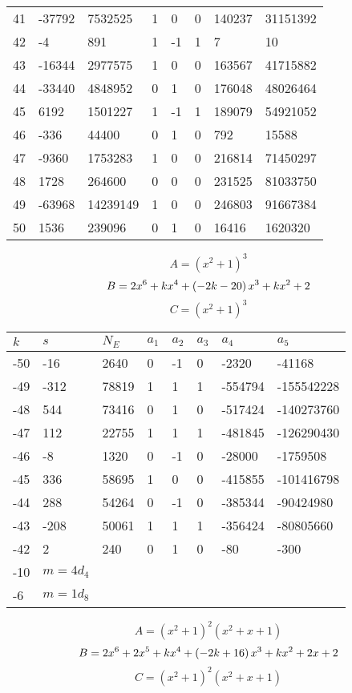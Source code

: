\documentclass{amsart}
\begin{document}
\begin{longtable}{|l|l|l|lllll|}
41&-37792&7532525&1&0&0&140237&31151392\\
42&-4&891&1&-1&1&7&10\\
43&-16344&2977575&1&0&0&163567&41715882\\
44&-33440&4848952&0&1&0&176048&48026464\\
45&6192&1501227&1&-1&1&189079&54921052\\
46&-336&44400&0&1&0&792&15588\\
47&-9360&1753283&1&0&0&216814&71450297\\
48&1728&264600&0&0&0&231525&81033750\\
49&-63968&14239149&1&0&0&246803&91667384\\
50&1536&239096&0&1&0&16416&1620320\\
\hline
\end{longtable}
$$A=(x^2
 + 1)^{3}$$
$$B=2\*x^6
 + k\*x^4
 + \left(-2\*k
 - 20\right) \*x^3
 + k\*x^2
 + 2$$
$$C=(x^2
 + 1)^{3}$$
\begin{longtable}{|l|l|l|lllll|}
\hline
$k$ & $s$ & $N_E$ & $a_1$ & $a_2$ & $a_3$ & $a_4$ & $a_5$\\
\hline
-50&-16&2640&0&-1&0&-2320&-41168\\
-49&-312&78819&1&1&1&-554794&-155542228\\
-48&544&73416&0&1&0&-517424&-140273760\\
-47&112&22755&1&1&1&-481845&-126290430\\
-46&-8&1320&0&-1&0&-28000&-1759508\\
-45&336&58695&1&0&0&-415855&-101416798\\
-44&288&54264&0&-1&0&-385344&-90424980\\
-43&-208&50061&1&1&1&-356424&-80805660\\
-42&2&240&0&1&0&-80&-300\\
-10&$m=4d_{4}$&&\multicolumn{5}{c|}{}\\
-6&$m=1d_{8}$&&\multicolumn{5}{c|}{}\\
\hline
\end{longtable}
$$A=(x^2
 + 1)^{2}(x^2
 + x
 + 1)$$
$$B=2\*x^6
 + 2\*x^5
 + k\*x^4
 + \left(-2\*k
 + 16\right) \*x^3
 + k\*x^2
 + 2\*x
 + 2$$
$$C=(x^2
 + 1)^{2}(x^2
 + x
 + 1)$$
\end{document}

